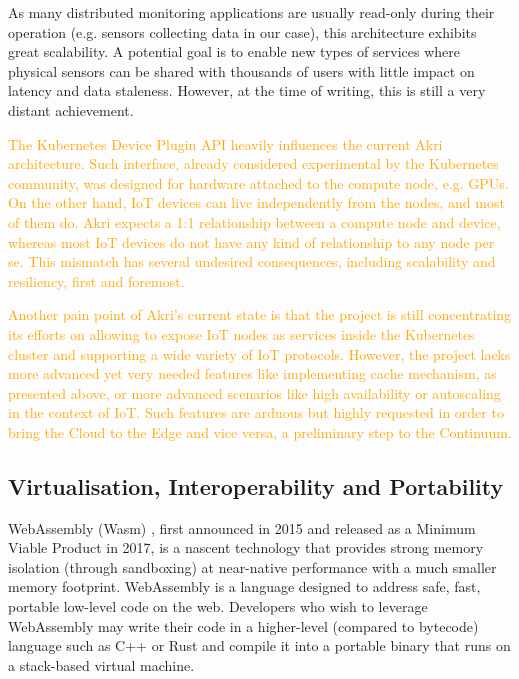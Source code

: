 As many distributed monitoring applications are usually read-only during their operation (e.g. sensors collecting data in our case), this architecture exhibits great scalability. A potential goal is to enable new types of services where physical sensors can be shared with thousands of users with little impact on latency and data staleness. However, at the time of writing, this is still a very distant achievement.

\textcolor{orange}{The Kubernetes Device Plugin API heavily influences the current Akri architecture. Such interface, already considered experimental by the Kubernetes community, was designed for hardware attached to the compute node, e.g. GPUs. On the other hand, IoT devices can live independently from the nodes, and most of them do. Akri expects a 1:1 relationship between a compute node and device, whereas most IoT devices do not have any kind of relationship to any node per se. This mismatch has several undesired consequences, including scalability and resiliency, first and foremost.}

\textcolor{orange}{Another pain point of Akri's current state is that the project is still concentrating its efforts on allowing to expose IoT nodes as services inside the Kubernetes cluster and supporting a wide variety of IoT protocols. However, the project lacks more advanced yet very needed features like implementing cache mechanism, as presented above, or more advanced scenarios like high availability or autoscaling in the context of IoT. Such features are arduous but highly requested in order to bring the Cloud to the Edge and vice versa, a preliminary step to the Continuum.}

\subsection{Virtualisation, Interoperability and Portability}\label{sec:virtualization}


WebAssembly (Wasm) \cite{haas2017bringing}, first announced in 2015 and released as a Minimum Viable Product in 2017, is a nascent technology that provides strong memory isolation (through sandboxing) at near-native performance with a much smaller memory footprint. WebAssembly is a language designed to address safe, fast, portable low-level code on the web. Developers who wish to leverage WebAssembly may write their code in a higher-level (compared to bytecode) language such as C++ or Rust and compile it into a portable binary that runs on a stack-based virtual machine.

